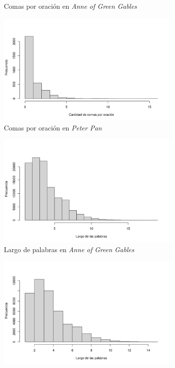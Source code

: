 \documentclass[12pt]{article}
\begin{document}
\begin{figure}
\begin{subfigure}{.5\textwidth}
			\caption{Comas por oración en \em Anne of Green Gables}
			\label{cpo_anne}
		\end{subfigure}
		\begin{subfigure}{0.5\textwidth}
			\centering
			\includegraphics[scale=0.4]{hist_cpo_peter.png}
			\caption{Comas por oración en \em Peter Pan}
			\label{cpo_peter}
		\end{subfigure}
		\begin{subfigure}{.5\textwidth}
			\centering
			\includegraphics[scale=0.4]{hist_tpalabras_anne.png}
			\caption{Largo de palabras en \em Anne of Green Gables}
			\label{tpalabras_anne}
		\end{subfigure}
		\begin{subfigure}{0.5\textwidth}
			\centering
			\includegraphics[scale=0.4]{hist_tpalabras_peter.png}

\end{subfigure}
\end{figure}
\end{document}
